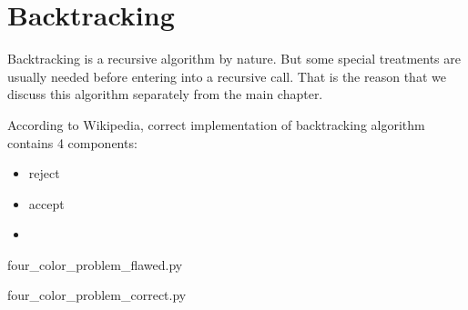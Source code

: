 
\chapter{Backtracking}\label{ch:backtracking}

Backtracking is a recursive algorithm by nature.
But some special treatments are usually needed before entering into a recursive call.
That is the reason that we discuss this algorithm separately from the main chapter.

According to Wikipedia, correct implementation of backtracking algorithm contains 4 components:
\begin{itemize}
    \item reject
    \item accept
    \item
\end{itemize}
\begin{clisting}
    
    {four_color_problem_flawed.py}
\end{clisting}

\begin{clisting}
    
    {four_color_problem_correct.py}
\end{clisting}
